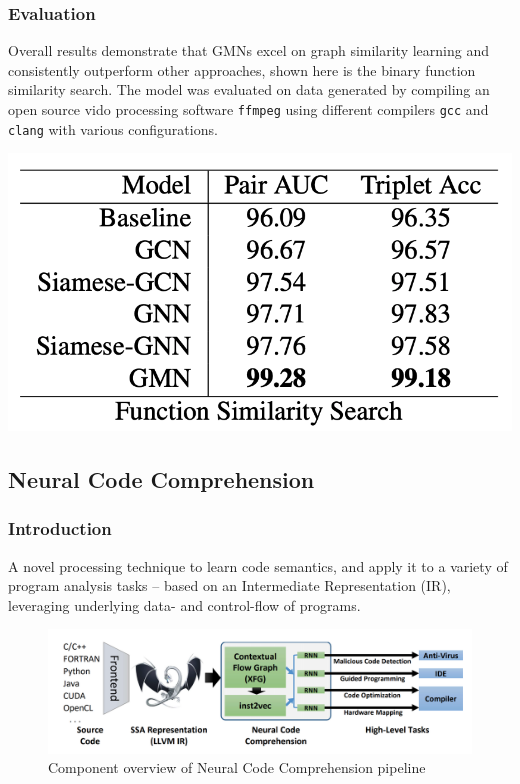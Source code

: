 \documentclass{article}
\begin{document}
\subsubsection{Evaluation}
Overall results demonstrate that GMNs excel on graph similarity learning and consistently outperform other approaches, shown here is the binary function similarity search.
The model was evaluated on data generated by compiling an open source vido processing software \texttt{ffmpeg} using different compilers \texttt{gcc} and \texttt{clang} with various configurations.
\centerline{\includegraphics[width=\columnwidth]{Images/Similarity3-1.png}}

\subsection{Neural Code Comprehension \cite{ben2018neural}}
\subsubsection{Introduction}
A novel processing technique to learn code semantics, and apply it to a variety of program analysis tasks – based on an Intermediate Representation (IR), leveraging underlying data- and control-flow of programs.\\
\begin{figure}[ht]
    \centerline{\includegraphics[width=\columnwidth]{Images/Similarity4-1.png}}
    \caption{Component overview of Neural Code Comprehension pipeline}
\end{figure}
\end{document}
